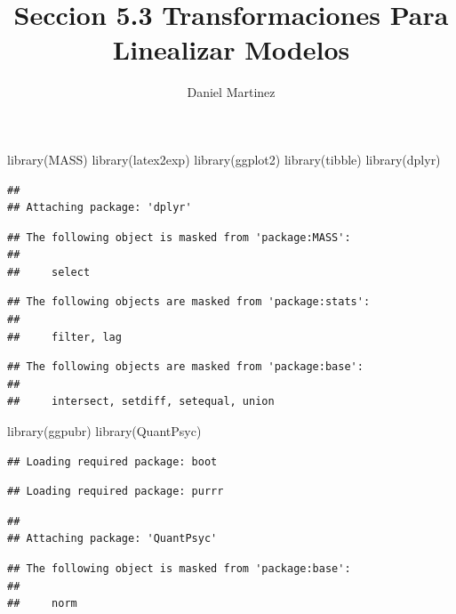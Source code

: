 \documentclass[
]{article}
\title{Seccion 5.3 Transformaciones Para Linealizar Modelos}
\author{Daniel Martinez}
\date{}
\newenvironment{Shaded}{\begin{snugshade}}{\end{snugshade}}
\newcommand{\FunctionTok}[1]{\textcolor[rgb]{0.00,0.00,0.00}{#1}}
\newcommand{\NormalTok}[1]{#1}
\begin{document}
\maketitle

\begin{Shaded}
\begin{Highlighting}[]
\FunctionTok{library}\NormalTok{(MASS)}
\FunctionTok{library}\NormalTok{(latex2exp)}
\FunctionTok{library}\NormalTok{(ggplot2)}
\FunctionTok{library}\NormalTok{(tibble)}
\FunctionTok{library}\NormalTok{(dplyr)}
\end{Highlighting}
\end{Shaded}

\begin{verbatim}
## 
## Attaching package: 'dplyr'
\end{verbatim}

\begin{verbatim}
## The following object is masked from 'package:MASS':
## 
##     select
\end{verbatim}

\begin{verbatim}
## The following objects are masked from 'package:stats':
## 
##     filter, lag
\end{verbatim}

\begin{verbatim}
## The following objects are masked from 'package:base':
## 
##     intersect, setdiff, setequal, union
\end{verbatim}

\begin{Shaded}
\begin{Highlighting}[]
\FunctionTok{library}\NormalTok{(ggpubr)}
\FunctionTok{library}\NormalTok{(QuantPsyc)}
\end{Highlighting}
\end{Shaded}

\begin{verbatim}
## Loading required package: boot
\end{verbatim}

\begin{verbatim}
## Loading required package: purrr
\end{verbatim}

\begin{verbatim}
## 
## Attaching package: 'QuantPsyc'
\end{verbatim}

\begin{verbatim}
## The following object is masked from 'package:base':
## 
##     norm
\end{verbatim}
\end{document}
